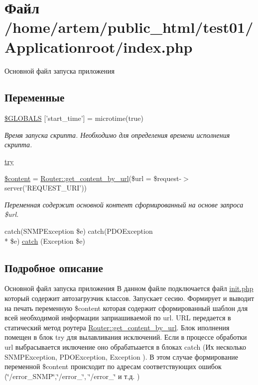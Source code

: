 \hypertarget{index_8php}{\section{Файл /home/artem/public\-\_\-html/test01/\-Applicationroot/index.php}
\label{index_8php}
}


Основной файл запуска приложения  


\subsection*{Переменные}
\begin{DoxyCompactItemize}
\item 
\hyperlink{index_8php_a1e4daea35abc15dd2599d5c8551ccba0}{\$\-G\-L\-O\-B\-A\-L\-S} \mbox{[}'start\-\_\-time'\mbox{]} = microtime(true)
\begin{DoxyCompactList}\small\item\em Время запуска скрипта. Необходимо для определения времени исполнения скрипта. \end{DoxyCompactList}\item 
\hyperlink{index_8php_abe4cc9788f52e49485473dc699537388}{try}
\item 
\hyperlink{index_8php_a57b284fe00866494b33afa80ba729bed}{\$content} = \hyperlink{class_router_a7e384b5b08035be60df7696428c6cf56}{Router\-::get\-\_\-content\-\_\-by\-\_\-url}(\$url = \$request-\/$>$server('R\-E\-Q\-U\-E\-S\-T\-\_\-\-U\-R\-I'))
\begin{DoxyCompactList}\small\item\em Переменная содержит основной контент сформированный на основе запроса \$url. \end{DoxyCompactList}\item 
catch(S\-N\-M\-P\-Exception \$e) catch(P\-D\-O\-Exception \\*
\$e) \hyperlink{index_8php_a51a795867632fb0101bd436c945c49ab}{catch} (Exception \$e)
\end{DoxyCompactItemize}


\subsection{Подробное описание}
Основной файл запуска приложения В данном файле подключается файл \hyperlink{init_8php}{init.\-php} который содержит автозагрузчик классов. Запускает сесию. Формирует и выводит на печать переменную \$content которая содержит сформированный шаблон для всей необходимой информации заприашиваемой по url. U\-R\-L передается в статический метод роутера \hyperlink{class_router_a7e384b5b08035be60df7696428c6cf56}{Router\-::get\-\_\-content\-\_\-by\-\_\-url}. Блок иполнения помещен в блок try для вылавливания исключений. Если в процессе обработки url выбрасывается иключение оно обрабатыается в блоках catch (Их несколько S\-N\-M\-P\-Exception, P\-D\-O\-Exception, Exception ). В этом случае формирование переменной \$content происходит по адресам соответствующих ошибок (\char`\"{}/error\-\_\-\-S\-N\-M\-P\char`\"{},\char`\"{}/error\-\_\char`\"{}, \char`\"{}/error\-\_\char`\"{} и т.\-д. ) 


